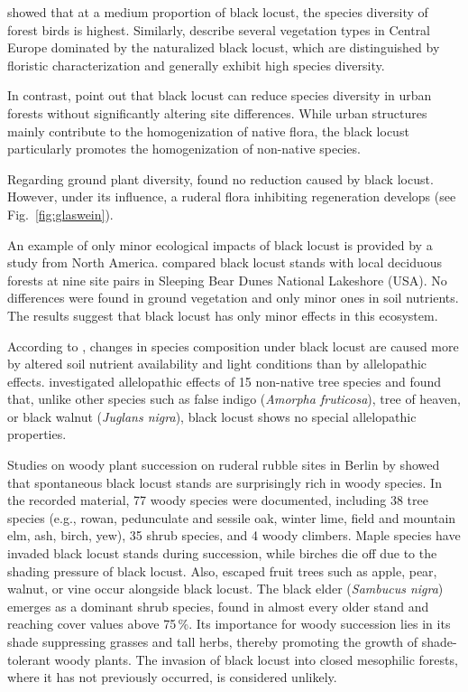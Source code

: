 \citet{kraftova2017robinieVoegel} showed that at a medium proportion of black locust, the species diversity of forest birds is highest. Similarly, \citet{vitkova2010robinieVegTyp} describe several vegetation types in Central Europe dominated by the naturalized black locust, which are distinguished by floristic characterization and generally exhibit high species diversity.

In contrast, \citet{trentanovi2013robinie} point out that black locust can reduce species diversity in urban forests without significantly altering site differences. While urban structures mainly contribute to the homogenization of native flora, the black locust particularly promotes the homogenization of non-native species.

Regarding ground plant diversity, \citet{sitzia2012robinie} found no reduction caused by black locust. However, under its influence, a ruderal flora inhibiting regeneration develops (see Fig.~\ref{fig:glaswein}).


An example of only minor ecological impacts of black locust is provided by a study from North America. \citet{deneau2013robinie} compared black locust stands with local deciduous forests at nine site pairs in Sleeping Bear Dunes National Lakeshore (USA). No differences were found in ground vegetation and only minor ones in soil nutrients. The results suggest that black locust has only minor effects in this ecosystem.

According to \citet{vitkova2017robinie}, changes in species composition under black locust are caused more by altered soil nutrient availability and light conditions than by allelopathic effects. \citet{csiszar2009allelopathy} investigated allelopathic effects of 15 non-native tree species and found that, unlike other species such as false indigo (\emph{Amorpha fruticosa}), tree of heaven, or black walnut (\emph{Juglans nigra}), black locust shows no special allelopathic properties.

Studies on woody plant succession on ruderal rubble sites in Berlin by \citet{kowarik1990robinie} showed that spontaneous black locust stands are surprisingly rich in woody species. In the recorded material, 77 woody species were documented, including 38 tree species (e.g., rowan, pedunculate and sessile oak, winter lime, field and mountain elm, ash, birch, yew), 35 shrub species, and 4 woody climbers. Maple species have invaded black locust stands during succession, while birches die off due to the shading pressure of black locust. Also, escaped fruit trees such as apple, pear, walnut, or vine occur alongside black locust. The black elder (\emph{Sambucus nigra}) emerges as a dominant shrub species, found in almost every older stand and reaching cover values above 75\,\%. Its importance for woody succession lies in its shade suppressing grasses and tall herbs, thereby promoting the growth of shade-tolerant woody plants. The invasion of black locust into closed mesophilic forests, where it has not previously occurred, is considered unlikely.


